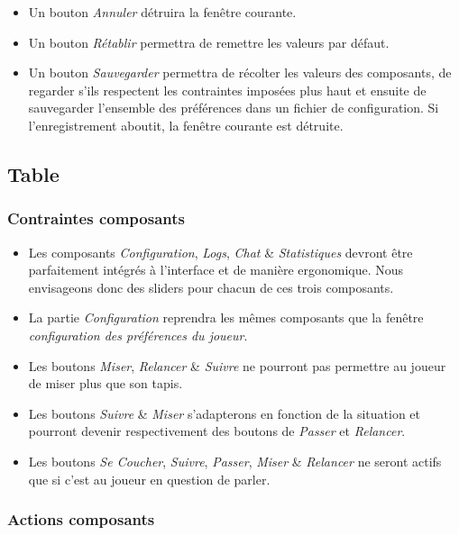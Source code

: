 \begin{itemize}
	\item Un bouton \textit{Annuler} détruira la fenêtre courante.
	\item Un bouton \textit{Rétablir} permettra de remettre les valeurs par défaut.
	\item Un bouton \textit{Sauvegarder} permettra de récolter les valeurs des 
	      composants, de regarder s'ils respectent les contraintes imposées plus
	      haut et ensuite de sauvegarder l'ensemble des préférences dans un fichier
	      de configuration. Si l'enregistrement aboutit, la fenêtre courante est détruite.
\end{itemize}

\subsection{Table}

\subsubsection{Contraintes composants}

\begin{itemize}
	\item Les composants \textit{Configuration}, \textit{Logs}, \textit{Chat} 
	     \& \textit{Statistiques} devront être parfaitement intégrés à 
	     l'interface et de manière ergonomique. Nous envisageons donc 
	     des \og sliders \fg pour chacun de ces trois composants.
	\item La partie \textit{Configuration} reprendra les mêmes composants que 
	      la fenêtre \textit{configuration des préférences du joueur}. 
	\item Les boutons \textit{Miser}, \textit{Relancer} \& \textit{Suivre} 
	      ne pourront pas permettre au joueur de miser plus que son tapis.
	\item Les boutons \textit{Suivre} \& \textit{Miser} s'adapterons en fonction
	      de la situation et pourront devenir respectivement des boutons de 
	      \textit{Passer} et \textit{Relancer}.  
	\item Les boutons \textit{Se Coucher}, \textit{Suivre}, \textit{Passer}, 
	      \textit{Miser} \& \textit{Relancer} ne seront actifs que si c'est au 
	      joueur en question de parler.
\end{itemize}

\subsubsection{Actions composants}

